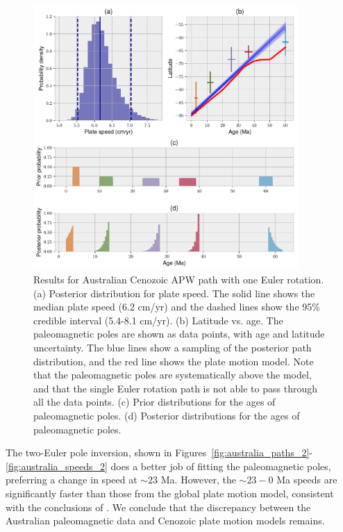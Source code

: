 \documentclass[preprint,12pt,authoryear]{elsarticle}
\begin{document}
\begin{figure}
\includegraphics[width=0.9\textwidth]{figures/australia/australia_speeds_1.pdf}
\caption[Results for Australian Cenozoic APW path with one Euler rotation.]{Results for Australian Cenozoic APW path with one Euler rotation. 
(a) Posterior distribution for plate speed. The solid line shows the median plate speed (6.2 cm/yr) and the dashed lines show the 95\% credible interval (5.4-8.1 cm/yr).
(b) Latitude vs. age. The paleomagnetic poles are shown as data points, with age and latitude uncertainty. The blue lines show a sampling of the posterior path distribution, and the red line shows the \citet{seton2012global} plate motion model. Note that the paleomagnetic poles are systematically above the \citet{seton2012global} model, and that the single Euler rotation path is not able to pass through all the data points.
(c) Prior distributions for the ages of paleomagnetic poles.
(d) Posterior distributions for the ages of paleomagnetic poles.}
\label{fig:australia_speeds_1}
\end{figure}

The two-Euler pole inversion, shown in Figures~\ref{fig:australia_paths_2}-\ref{fig:australia_speeds_2} does a better job of
fitting the paleomagnetic poles, preferring a change in speed at $\sim 23$ Ma.
However, the $\sim23-0$ Ma speeds are significantly faster than those from the global plate motion model,
consistent with the conclusions of \citet{idnurm1985lateII}.
We conclude that the discrepancy between the Australian paleomagnetic data and
Cenozoic plate motion models remains.
\end{document}
